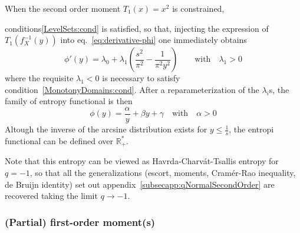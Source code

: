 \documentclass[entropy,article,submit,moreauthors,pdftex]{Definitions/mdpi}
\newcommand{\SZ}[1]{{\color{blue} #1}}                                       %
\def\Rset{\mathbb{R}}%
\begin{document}
When   the    second   order   moment    $T_1(x)   =   x^2$    is   constrained,
\SZ{conditions\ref{LevelSets:cond}   is  satisfied,   so  that,   injecting  the
  expression       of      $T_1\left(       f_X^{-1}(y)      \right)$       into
  eq.~\eqref{eq:derivative-phi} one immediately obtains
%
\[
\phi'(y)=\lambda_0  + \lambda_1  \left( \frac{s^2}{\pi^2}  - \frac{1}{\pi^2  y^2}\right)
\qquad \mbox{with} \quad \lambda_1 > 0
\]
%
where    the   requisite    $\lambda_1   <0$    is   necessary    to   satisfy
  condition~\ref{MonotonyDomains:cond}.   After  a   reparameterization  of   the
  $\lambda_i$s, the family of entropy functional is then
%
\[
\phi(y)  = \frac{\alpha}{y} + \beta y + \gamma \quad \mbox{with}
  \quad \alpha > 0
\]
%
Altough the inverse of the arcsine  distribution exists for $y \le \frac{1}{s}$,
the entropi functional can be defined over $\Rset_+^*$.

Note that this entropy can be viewed as Havrda-Charv\'at-Tsallis entropy for $q
= -1$, so that all  the generalizations (escort, moments, Cram\'er-Rao inequality,
de  Bruijn  identity)  set out  appendix~\ref{subsecapp:qNormalSecondOrder}  are
recovered taking the limit $q \to -1$.}



\subsubsection{(Partial) first-order moment(s)}
\label{subsubsecapp:ArcsineFirstPartial}
\end{document}
